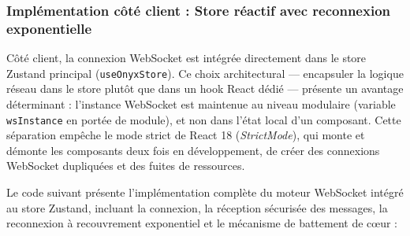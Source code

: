 \subsubsection{Implémentation côté client : Store réactif avec reconnexion exponentielle}

Côté client, la connexion WebSocket est intégrée directement dans le store Zustand principal (\texttt{useOnyxStore}). Ce choix architectural --- encapsuler la logique réseau dans le store plutôt que dans un hook React dédié --- présente un avantage déterminant : l'instance WebSocket est maintenue au niveau modulaire (variable \texttt{wsInstance} en portée de module), et non dans l'état local d'un composant. Cette séparation empêche le mode strict de React 18 (\textit{StrictMode}), qui monte et démonte les composants deux fois en développement, de créer des connexions WebSocket dupliquées et des fuites de ressources.

Le code suivant présente l'implémentation complète du moteur WebSocket intégré au store Zustand, incluant la connexion, la réception sécurisée des messages, la reconnexion à recouvrement exponentiel et le mécanisme de battement de cœur :


